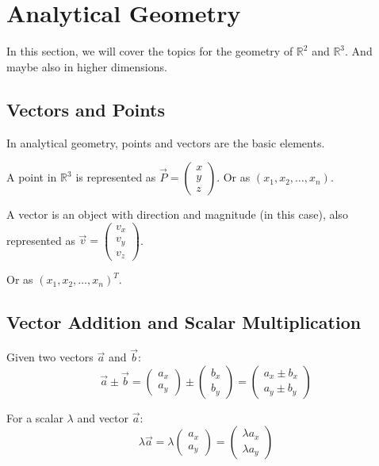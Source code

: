 \newpage
\section{Analytical Geometry}

In this section, we will cover the topics for the geometry of \(\mathbb{R}^2\) and \(\mathbb{R}^3\).
And maybe also in higher dimensions.

\subsection{Vectors and Points}
In analytical geometry, points and vectors are the basic elements.
\vspace{\baselineskip}

A point in \(\mathbb{R}^3\) is represented as \(\vec{P} = \begin{pmatrix} x \\ y \\ z \end{pmatrix}\).
Or as \((x_1, x_2, \dots , x_n)\).
\vspace{\baselineskip}

A vector is an object with direction and magnitude (in this case), also represented as \(\vec{v} = \begin{pmatrix} v_x \\ v_y \\ v_z \end{pmatrix}\).
\vspace{\baselineskip}

Or as \({(x_1, x_2, \dots , x_n)}^{T}\).

\subsection{Vector Addition and Scalar Multiplication}
Given two vectors \(\vec{a}\) and \(\vec{b}\):
\[
	\vec{a} \pm  \vec{b} = \begin{pmatrix} a_x \\ a_y \end{pmatrix} \pm \begin{pmatrix} b_x \\ b_y \end{pmatrix} = \begin{pmatrix} a_x \pm b_x \\ a_y \pm b_y \end{pmatrix}
\]

For a scalar \(\lambda\) and vector \(\vec{a}\):
\[
	\lambda \vec{a} = \lambda \begin{pmatrix} a_x \\ a_y \end{pmatrix} = \begin{pmatrix} \lambda a_x \\ \lambda a_y \end{pmatrix}
\]

